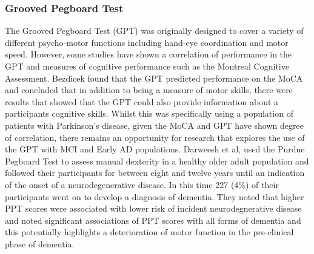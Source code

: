 \documentclass[12pt, twoside, a4paper]{article}
\begin{document}
\subsubsection{Grooved Pegboard Test}
The Grooved Pegboard Test (GPT) was originally designed to cover a variety of different psycho-motor functions including hand-eye coordination and motor speed. However, some studies have shown a correlation of performance in the GPT and measures of cognitive performance such as the Montreal Cognitive Assessment.
Bezdicek found that the GPT predicted performance on the MoCA and concluded that in addition to being a measure of motor skills, there were results that showed that the GPT could also provide information about a participants cognitive skills. Whilst this was specifically using a population of patients with Parkinson's disease, given the MoCA and GPT have shown degree of correlation, there remains an opportunity for research that explores the use of the GPT with MCI and Early AD populations.
Darweesh et al, used the Purdue Pegboard Test to assess manual dexterity in a healthy older adult population and followed their participants for between eight and twelve years until an indication of the onset of a neurodegenerative disease. In this time 227 (4\%) of their participants went on to develop a diagnosis of dementia. They noted that higher PPT scores were associated with lower risk of incident neurodegnerative disease and noted significant associations of PPT scores with all forms of dementia and this potentially highlights a deterioration of motor function in the pre-clinical  phase of dementia.
\end{document}
